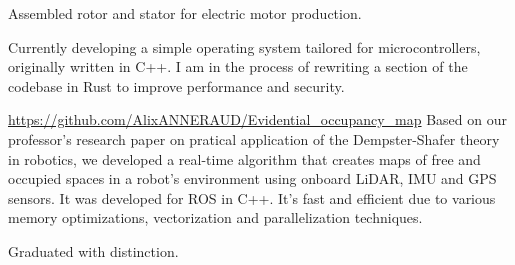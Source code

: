 \documentclass[10pt,a4paper,ragged2e,withhyper]{../AltaCV/altacv}
\begin{document}
\begin{paracol}{2}
  Assembled rotor and stator for electric motor production.

  \smallskip


  Currently developing a simple operating system tailored for microcontrollers, originally written in C++.
  I am in the process of rewriting a section of the codebase in Rust to improve performance and security.

  \divider

  {\url{https://github.com/AlixANNERAUD/Evidential_occupancy_map}}
  {}
  {}
  Based on our professor’s research paper on pratical application of the Dempster-Shafer theory in robotics, we developed a real-time algorithm that creates maps of free and occupied spaces in a robot’s environment using onboard LiDAR, IMU and GPS sensors.
  It was developed for ROS in C++.
  It's fast and efficient due to various memory optimizations, vectorization and parallelization techniques. 

  \medskip

  \switchcolumn



  \divider

  Graduated with distinction.

  \divider


  \smallskip



  \divider


  \divider




\end{paracol}
\end{document}
